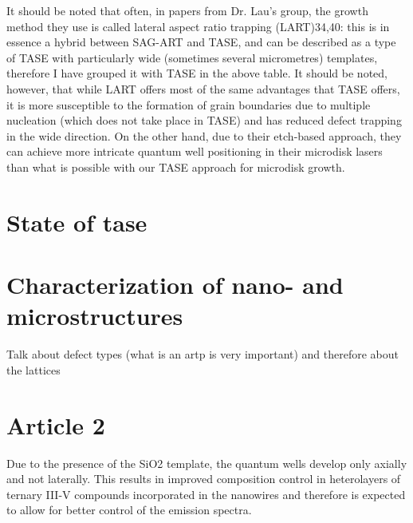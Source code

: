 It should be noted that often, in papers from Dr. Lau’s group, the growth method they use is called lateral aspect ratio trapping (LART)34,40: this is in essence a hybrid between SAG-ART and TASE, and can be described as a type of TASE with particularly wide (sometimes several micrometres) templates, therefore I have grouped it with TASE in the above table. It should be noted, however, that while LART offers most of the same advantages that TASE offers, it is more susceptible to the formation of grain boundaries due to multiple nucleation (which does not take place in TASE) and has reduced defect trapping in the wide direction. On the other hand, due to their etch-based approach, they can achieve more intricate quantum well positioning in their microdisk lasers than what is possible with our TASE approach for microdisk growth.

\section{\texorpdfstring{State of \acl{tase}}{State of template assisted selective epitaxy}}
\section{Characterization of nano- and microstructures}
Talk about defect types (what is an artp is very important) and therefore about the lattices

\section{Article 2}

Due to the presence of the SiO2 template, the quantum wells
develop only axially and not laterally. This results in improved
composition control in heterolayers of ternary III-V
compounds incorporated in the nanowires\cite{Borg2019} and therefore is
expected to allow for better control of the emission spectra.
